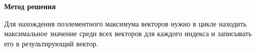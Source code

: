 \textbf{\large Метод решения}

Для нахождения поэлементного максимума векторов нужно в цикле находить максимальное значение среди всех векторов для каждого индекса и записывать его в результирующий вектор.

